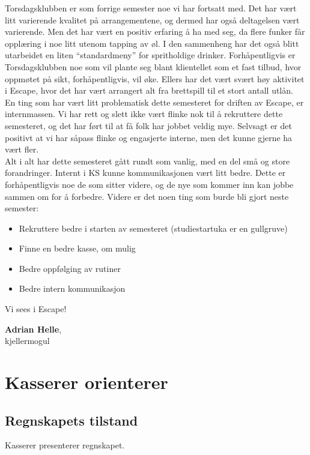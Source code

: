 \documentclass[10pt,norsk,a4paper]{article}
\begin{document}
\begin{multicols}{2}
Torsdagsklubben er som forrige semester noe vi har fortsatt med. Det har vært litt varierende kvalitet på arrangementene, og dermed har også deltagelsen vært varierende. Men det har vært en positiv erfaring å ha med seg, da flere funker får opplæring i noe litt utenom tapping av øl. I den sammenheng har det også blitt utarbeidet en liten “standardmeny” for spritholdige drinker. Forhåpentligvis er Torsdagsklubben noe som vil plante seg blant klientellet som et fast tilbud, hvor oppmøtet på sikt, forhåpentligvis, vil øke. Ellers har det vært svært høy aktivitet i Escape, hvor det har vært arrangert alt fra brettspill til et stort antall utlån.\\

En ting som har vært litt problematisk dette semesteret for driften av Escape, er internmassen. Vi har rett og slett ikke vært flinke nok til å rekruttere dette semesteret, og det har ført til at få folk har jobbet veldig mye. Selvsagt er det positivt at vi har såpass flinke og engasjerte interne, men det kunne gjerne ha vært fler.\\

Alt i alt har dette semesteret gått rundt som vanlig, med en del små og store forandringer. Internt i KS kunne kommunikasjonen vært litt bedre. Dette er forhåpentligvis noe de som sitter videre, og de nye som kommer inn kan jobbe sammen om for å forbedre. Videre er det noen ting som burde bli gjort neste semester:\\
\begin{itemize}
		\item Rekruttere bedre i starten av semesteret (studiestartuka er en gullgruve)
		\item Finne en bedre kasse, om mulig
		\item Bedre oppfølging av rutiner
		\item Bedre intern kommunikasjon
\end{itemize}
\end{multicols}
Vi sees i Escape!

\textbf{Adrian Helle}, \\
kjellermogul \\
\date{24.\ april 2018}


\section{Kasserer orienterer}
\subsection{Regnskapets tilstand}
Kasserer presenterer regnskapet.
\end{document}
